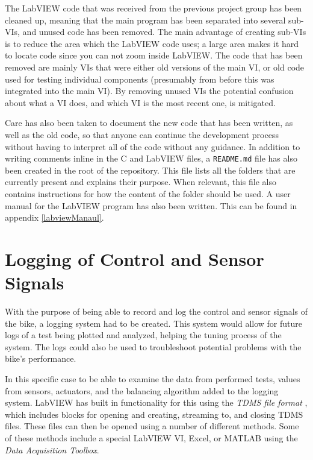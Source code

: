 The LabVIEW code that was received from the previous project group has been cleaned up, meaning that the main program has been separated into several sub-VIs, and unused code has been removed. The main advantage of creating sub-VIs is to reduce the area which the LabVIEW code uses; a large area makes it hard to locate code since you can not zoom inside LabVIEW. The code that has been removed are mainly VIs that were either old versions of the main VI, or old code used for testing individual components (presumably from before this was integrated into the main VI). By removing unused VIs the potential confusion about what a VI does, and which VI is the most recent one, is mitigated.

Care has also been taken to document the new code that has been written, as well as the old code, so that anyone can continue the development process without having to interpret all of the code without any guidance. In addition to writing comments inline in the C and LabVIEW files, a \texttt{README.md} file has also been created in the root of the repository. This file lists all the folders that are currently present and explains their purpose. When relevant, this file also contains instructions for how the content of the folder should be used. A user manual for the LabVIEW program has also been written. This can be found in appendix \ref{labviewManaul}.

\section{Logging of Control and Sensor Signals} \label{method:logging}

With the purpose of being able to record and log the control and sensor signals of the bike, a logging system had to be created. This system would allow for future logs of a test being plotted and analyzed, helping the tuning process of the system. The logs could also be used to troubleshoot potential problems with the bike's performance.

In this specific case to be able to examine the data from performed tests, values from sensors, actuators, and the balancing algorithm added to the logging system. LabVIEW has built in functionality for this using the \textit{TDMS file format} \cite{NationalInstruments2022TheFormat}, which includes blocks for opening and creating, streaming to, and closing TDMS files. These files can then be opened using a number of different methods. Some of these methods include a special LabVIEW VI, Excel, or MATLAB using the \textit{Data Acquisition Toolbox}. 


